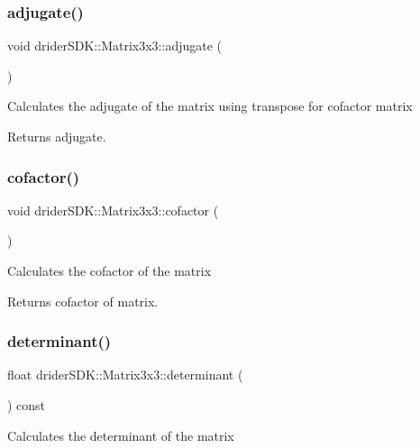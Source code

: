 \subsubsection{\texorpdfstring{adjugate()}{adjugate()}}
{\footnotesize\ttfamily void drider\+S\+D\+K\+::\+Matrix3x3\+::adjugate (\begin{DoxyParamCaption}{ }\end{DoxyParamCaption})}

Calculates the adjugate of the matrix using transpose for cofactor matrix

\begin{DoxyReturn}{Returns}
adjugate. 
\end{DoxyReturn}
\mbox{\label{classdrider_s_d_k_1_1_matrix3x3_a27658d6187c0b87a82b1e85b77da9006}} 
\subsubsection{\texorpdfstring{cofactor()}{cofactor()}}
{\footnotesize\ttfamily void drider\+S\+D\+K\+::\+Matrix3x3\+::cofactor (\begin{DoxyParamCaption}{ }\end{DoxyParamCaption})}

Calculates the cofactor of the matrix

\begin{DoxyReturn}{Returns}
cofactor of matrix. 
\end{DoxyReturn}
\mbox{\label{classdrider_s_d_k_1_1_matrix3x3_a5f9caa3838c81426ab99b408de64a3dd}} 
\subsubsection{\texorpdfstring{determinant()}{determinant()}}
{\footnotesize\ttfamily float drider\+S\+D\+K\+::\+Matrix3x3\+::determinant (\begin{DoxyParamCaption}{ }\end{DoxyParamCaption}) const}

Calculates the determinant of the matrix

